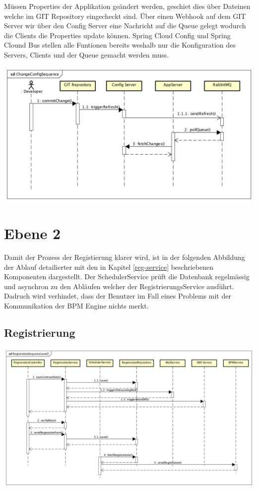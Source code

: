 Müssen Properties der Applikation geändert werden, geschiet dies über Dateinen  welche im GIT Repository eingecheckt sind. Über einen Webhook auf dem GIT Server wir über den Config Server eine Nachricht auf die Queue gelegt wodurch die Clients die Properties update können. Spring Cloud Config und Spring Clound Bus stellen alle Funtionen bereits weshalb nur die Konfiguration des Servers, Clients und der Queue gemacht werden muss.
\begin{center}
	\includegraphics[scale=0.6]{ChangeConfigSequence.png}
\end{center}
\newpage
\section{Ebene 2}

Damit der Prozess der Registierung klarer wird, ist in der folgenden Abbildung der Ablauf detailierter mit den in Kapitel \ref{reg-service} beschriebenen Komponenten dargestellt. Der SchedulerService prüft die Datenbank regelmässig und asynchron zu den Abläufen welcher der RegistrierungsService ausführt. Dadruch wird verhindet, dass der Benutzer im Fall eines Problems mit der Kommunikation der BPM Engine nichts merkt.
\subsection{Registrierung}
\begin{center}
	\includegraphics[scale=0.42]{RegistrationSequenceLevel2.png}
\end{center}



